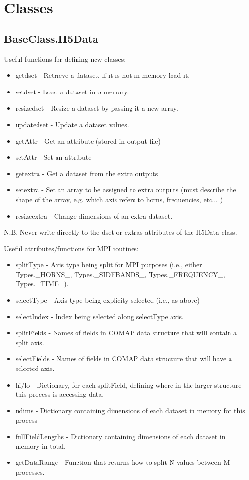 \documentclass[11pt]{article}
\begin{document}
\section{Classes}\label{sec:classes}

\subsection{BaseClass.H5Data}

Useful functions for defining new classes:
\begin{itemize}
  \item getdset - Retrieve a dataset, if it is not in memory load it.
  \item setdset - Load a dataset into memory.
  \item resizedset - Resize a dataset by passing it a new array.
  \item updatedset - Update a dataset values.
  \item getAttr    - Get an attribute (stored in output file)
  \item setAttr    - Set an attribute
  \item getextra - Get a dataset from the extra outputs
  \item setextra - Set an array to be assigned to extra outputs (must describe the shape of the array, e.g. which axis refers to horns, frequencies, etc... )
  \item resizeextra - Change dimensions of an extra dataset.
\end{itemize}
N.B. Never write directly to the dset or extras attributes of the H5Data class.

Useful attributes/functions for MPI routines:
\begin{itemize}
\item splitType - Axis type being split for MPI purposes (i.e., either Types.\_HORNS\_, Types.\_SIDEBANDS\_, Types.\_FREQUENCY\_, Types.\_TIME\_).
\item selectType - Axis type being explicity selected (i.e., as above)
\item selectIndex - Index being selected along selectType axis.
\item splitFields - Names of fields in COMAP data structure that will contain a split axis.
\item selectFields - Names of fields in COMAP data structure that will have a selected axis.
\item hi/lo - Dictionary, for each splitField, defining where in the larger structure this process is accessing data.
\item ndims - Dictionary containing dimensions of each dataset in memory for this process.
\item fullFieldLengths - Dictionary containing dimensions of each dataset in memory in total.
\item getDataRange - Function that returns how to split N values between M processes.
\end{itemize}
\end{document}
